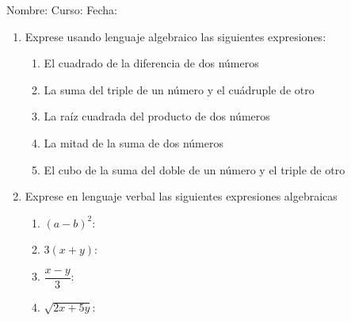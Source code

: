 \documentclass[letterpaper,fleqn]{article}
\newcommand{\LineaNombre}{%
\par
\vspace{\baselineskip}
Nombre:\hrulefill \; Curso: \underline{\hspace*{48pt}} \; Fecha: \underline{\hspace*{2.5cm}} \relax
\par}
\begin{document}
\LineaNombre
\begin{enumerate}
 \item Exprese usando lenguaje algebraico las siguientes expresiones:
 \begin{enumerate}
  \item El cuadrado de la diferencia de dos números \answer*[0pt]
  \item La suma del triple de un número y el cuádruple de otro \answer*[0pt]
  \item La raíz cuadrada del producto de dos números\answer*[0pt]
  \item La mitad de la suma de dos números \answer*[0pt]
  \item El cubo de la suma del doble de un número y el triple de otro \answer*[0pt]
 \end{enumerate}
\item Exprese en lenguaje verbal las siguientes expresiones algebraicas
\begin{enumerate}
 \item $(a-b)^{2}$:
 \item $3(x+y)$: 
 \item $\dfrac{x-y}{3}$:
 \item $\sqrt{2x+5y}$:
\end{enumerate}

 \end{enumerate}
\end{document}
